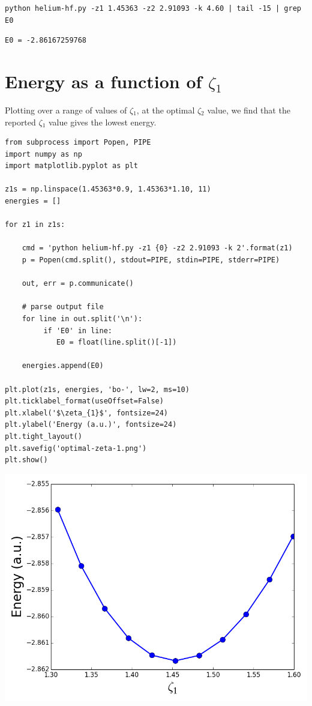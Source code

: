 \documentclass[11pt]{article}
\begin{document}
\begin{verbatim}
python helium-hf.py -z1 1.45363 -z2 2.91093 -k 4.60 | tail -15 | grep E0
\end{verbatim}

\begin{verbatim}
E0 = -2.86167259768
\end{verbatim}


\section{Energy as a function of $\zeta$$_{\text{1}}$}
\label{sec-6}

Plotting over a range of values of $\zeta$$_{\text{1}}$, at the optimal $\zeta$$_{\text{2}}$ value, we find that the reported $\zeta$$_{\text{1}}$ value gives the lowest energy.

\begin{verbatim}
from subprocess import Popen, PIPE
import numpy as np
import matplotlib.pyplot as plt

z1s = np.linspace(1.45363*0.9, 1.45363*1.10, 11)
energies = []

for z1 in z1s:
    
    cmd = 'python helium-hf.py -z1 {0} -z2 2.91093 -k 2'.format(z1)
    p = Popen(cmd.split(), stdout=PIPE, stdin=PIPE, stderr=PIPE)
    
    out, err = p.communicate()
    
    # parse output file
    for line in out.split('\n'):
         if 'E0' in line: 
            E0 = float(line.split()[-1])

    energies.append(E0)
    
plt.plot(z1s, energies, 'bo-', lw=2, ms=10)
plt.ticklabel_format(useOffset=False)
plt.xlabel('$\zeta_{1}$', fontsize=24)
plt.ylabel('Energy (a.u.)', fontsize=24)
plt.tight_layout()
plt.savefig('optimal-zeta-1.png')
plt.show()
\end{verbatim}

\includegraphics[width=.9\linewidth]{./optimal-zeta-1.png}
\end{document}
